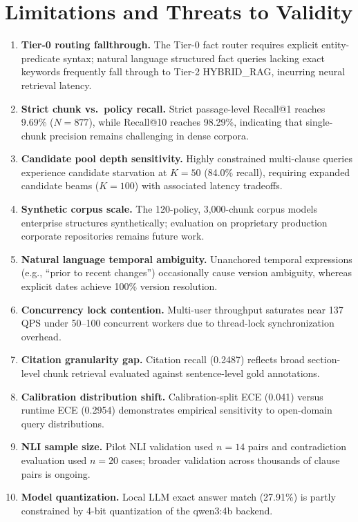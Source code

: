 \documentclass[journal]{IEEEtran}
\begin{document}
\section{Limitations and Threats to Validity}
\balance

\begin{enumerate}
  \setlength{\itemsep}{0pt}\setlength{\parsep}{0pt}\setlength{\topsep}{0.5pt}
  \item \textbf{Tier-0 routing fallthrough.} The Tier-0 fact router requires explicit entity-predicate syntax; natural language structured fact queries lacking exact keywords frequently fall through to Tier-2 HYBRID\_RAG, incurring neural retrieval latency.
  \item \textbf{Strict chunk vs.\ policy recall.} Strict passage-level Recall@1 reaches 9.69\% ($N=877$), while Recall@10 reaches 98.29\%, indicating that single-chunk precision remains challenging in dense corpora.
  \item \textbf{Candidate pool depth sensitivity.} Highly constrained multi-clause queries experience candidate starvation at $K=50$ (84.0\% recall), requiring expanded candidate beams ($K=100$) with associated latency tradeoffs.
  \item \textbf{Synthetic corpus scale.} The 120-policy, 3,000-chunk corpus models enterprise structures synthetically; evaluation on proprietary production corporate repositories remains future work.
  \item \textbf{Natural language temporal ambiguity.} Unanchored temporal expressions (e.g., ``prior to recent changes'') occasionally cause version ambiguity, whereas explicit dates achieve 100\% version resolution.
  \item \textbf{Concurrency lock contention.} Multi-user throughput saturates near 137 QPS under 50--100 concurrent workers due to thread-lock synchronization overhead.
  \item \textbf{Citation granularity gap.} Citation recall (0.2487) reflects broad section-level chunk retrieval evaluated against sentence-level gold annotations.
  \item \textbf{Calibration distribution shift.} Calibration-split ECE (0.041) versus runtime ECE (0.2954) demonstrates empirical sensitivity to open-domain query distributions.
  \item \textbf{NLI sample size.} Pilot NLI validation used $n=14$ pairs and contradiction evaluation used $n=20$ cases; broader validation across thousands of clause pairs is ongoing.
  \item \textbf{Model quantization.} Local LLM exact answer match (27.91\%) is partly constrained by 4-bit quantization of the qwen3:4b backend.
\end{enumerate}
\end{document}
